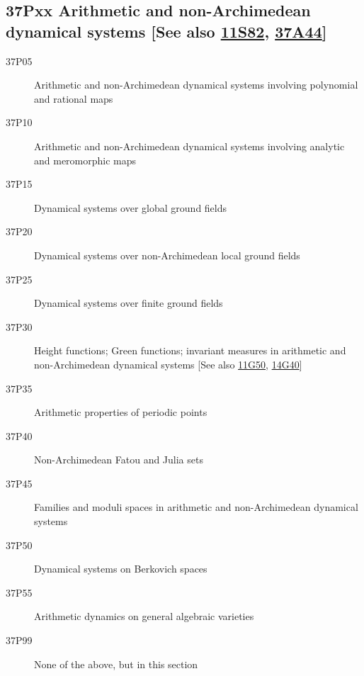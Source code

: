 \subsection*{37Pxx  Arithmetic and non-Archimedean dynamical systems [See also \hyperref[11S82]{11S82}, \hyperref[37A44]{37A44}] }\label{37Pxx}
\begin{description} 
\item [37P05]\label{37P05} Arithmetic and non-Archimedean dynamical systems involving polynomial and rational maps
\item [37P10]\label{37P10} Arithmetic and non-Archimedean dynamical systems involving analytic and meromorphic maps
\item [37P15]\label{37P15} Dynamical systems over global ground fields
\item [37P20]\label{37P20} Dynamical systems over non-Archimedean local ground fields
\item [37P25]\label{37P25} Dynamical systems over finite ground fields 
\item [37P30]\label{37P30} Height functions; Green functions; invariant measures in arithmetic and non-Archimedean dynamical systems [See also \hyperref[11G50]{11G50}, \hyperref[14G40]{14G40}]
\item [37P35]\label{37P35} Arithmetic properties of periodic points
\item [37P40]\label{37P40} Non-Archimedean Fatou and Julia sets
\item [37P45]\label{37P45} Families and moduli spaces in arithmetic and non-Archimedean dynamical systems
\item [37P50]\label{37P50} Dynamical systems on Berkovich spaces
\item [37P55]\label{37P55} Arithmetic dynamics on general algebraic varieties
\item [37P99]\label{37P99} None of the above, but in this section
\end{description}
